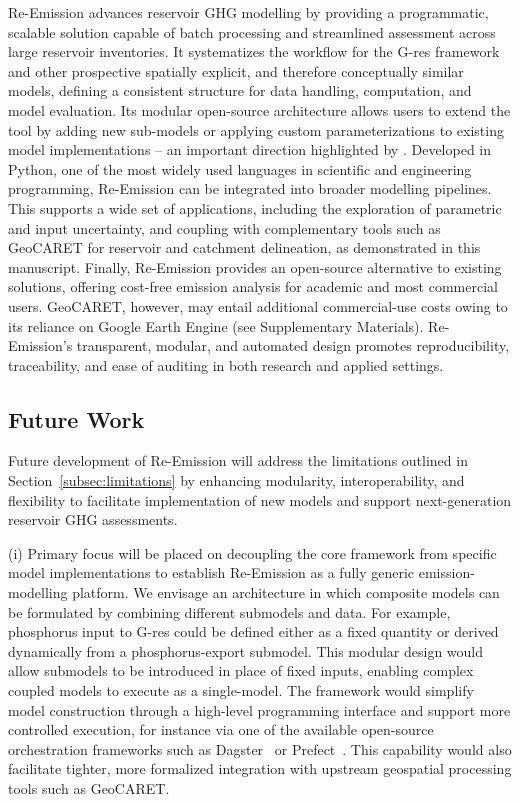 \documentclass[review, authoryear, 1p]{elsarticle} %
\begin{document}
Re-Emission advances reservoir \ac{GHG} modelling by providing a programmatic, scalable solution capable of batch processing and streamlined assessment across large reservoir inventories. 
It systematizes the workflow for the G-res framework and other prospective spatially explicit, and therefore conceptually similar models, defining a consistent structure for data handling, computation, and model evaluation.
Its modular open-source architecture allows users to extend the tool by adding new sub-models or applying custom parameterizations to existing model implementations -- an important direction highlighted by \citet{Pilla2025}.
Developed in Python, one of the most widely used languages in scientific and engineering programming, Re-Emission can be integrated into broader modelling pipelines.
This supports a wide set of applications, including the exploration of parametric and input uncertainty, and coupling with complementary tools such as GeoCARET for reservoir and catchment delineation, as demonstrated in this manuscript.
Finally, Re-Emission provides an open-source alternative to existing solutions, offering cost-free emission analysis for academic and most commercial users.
GeoCARET, however, may entail additional commercial-use costs owing to its reliance on Google Earth Engine (see Supplementary Materials).
Re-Emission's transparent, modular, and automated design promotes reproducibility, traceability, and ease of auditing in both research and applied settings.

\subsection{Future Work}
\label{subsec:future_work}

Future development of Re-Emission will address the limitations outlined in Section~\ref{subsec:limitations} by enhancing modularity, interoperability, and flexibility to facilitate implementation of new models and support next-generation reservoir \ac{GHG} assessments.

(i) Primary focus will be placed on decoupling the core framework from specific model implementations to establish Re-Emission as a fully generic emission-modelling platform.
We envisage an architecture in which composite models can be formulated by combining different submodels and data.
For example, phosphorus input to G-res could be defined either as a fixed quantity or derived dynamically from a phosphorus-export submodel.
This modular design would allow submodels to be introduced in place of fixed inputs, enabling complex coupled models to execute as a single-model.
The framework would simplify model construction through a high-level programming interface and support more controlled execution, for instance via one of the available open-source orchestration frameworks such as Dagster~\citep{dagster} or Prefect~\citep{prefect}.
This capability would also facilitate tighter, more formalized integration with upstream geospatial processing tools such as GeoCARET.
\end{document}
